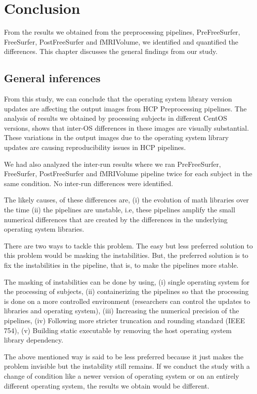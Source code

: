 \chapter{Conclusion}\label{conclusion}
From the results we obtained from the preprocessing pipelines, PreFreeSurfer, FreeSurfer, PostFreeSurfer and fMRIVolume, we identified and quantified the differences. This chapter discusses the general findings from our study.

\section{General inferences}
From this study, we can conclude that the operating system library version updates are affecting the output images from HCP Preprocessing pipelines. The analysis of results we obtained by processing subjects in different CentOS versions, shows that inter-OS differences in these images are visually substantial. These variations in the output images due to the operating system library updates are causing reproducibility issues in HCP pipelines.

We had also analyzed the inter-run results where we ran PreFreeSurfer, FreeSurfer, PostFreeSurfer and fMRIVolume pipeline twice for each subject in the same condition. No inter-run differences were identified.

The likely causes, of these differences are, (i) the evolution of math libraries over the time (ii) the pipelines are unstable, i.e, these pipelines amplify the small numerical differences that are created by the differences in the underlying operating system libraries.

There are two ways to tackle this problem. The easy but less preferred solution to this problem would be masking the instabilities. But, the preferred solution is to fix the instabilities in the pipeline, that is, to make the pipelines more stable.

The masking of instabilities can be done by using, (i) single operating system for the processing of subjects, (ii) containerizing the pipelines so that the processing is done on a more controlled environment (researchers can control the updates to libraries and operating system), (iii) Increasing the numerical precision of the pipelines, (iv) Following more stricter truncation and rounding standard (IEEE 754), (v) Building static executable by removing the host operating system library dependency.

The above mentioned way is said to be less preferred because it just makes the problem invisible but the instability still remains. If we conduct the study with a change of condition like a newer version of operating system or on an entirely different operating system, the results we obtain would be different.

